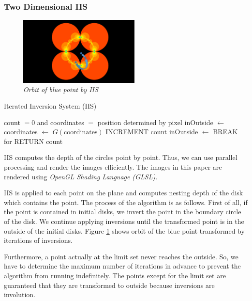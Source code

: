 \subsubsection{Two Dimensional IIS}

\begin{figure}[htbp]
  \center
  \includegraphics[height=1.35in, keepaspectratio]{img/preparation/orbIIS.png}
  \caption{\textit{Orbit of blue point by IIS}}
  \label{fig:iisOrbit}
 \hspace*{\fill}
\end{figure}

 \begin{algorithm}
  \caption{Iterated Inversion System (IIS)}
  \label{arg:iis2d}
  \begin{algorithmic}
   \REQUIRE count $= 0$ and coordinates $=$ position determined by
   pixel
   \STATE inOutside $\leftarrow$ \TRUE
   \STATE coordinates $\leftarrow$ $G(\text{coordinates})$
   \STATE INCREMENT count
   \STATE inOutside $\leftarrow$ \FALSE
   \ENDIF
   \ENDFOR
   \STATE BREAK for
   \ENDIF
   \ENDFOR
   \STATE RETURN count
  \end{algorithmic}
 \end{algorithm}

\noindent IIS computes the depth of the circles point by point.
Thus, we can use parallel processing and render the images efficiently.
The images in this paper are rendered using \textit{OpenGL Shading
Language (GLSL)}.

IIS is applied to each point on the plane and computes nesting depth of
the disk which contains the point.
The process of the algorithm is as follows.
First of all, if the point is contained in initial disks, we invert the
point in the boundary circle of the disk.
We continue applying inversions until the transformed point is in the
outside of the initial disks.
Figure \ref{fig:iisOrbit} shows orbit of the blue point transformed by
iterations of inversions.

Furthermore, a point actually at the limit set never reaches the
outside. So, we have to determine the maximum number of iterations in
advance to prevent the algorithm from running indefinitely.
The points except for the limit set are guaranteed that they
are transformed to outside because inversions are involution.

